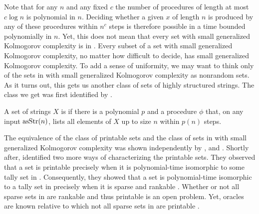 Note that for any $n$ and any fixed $c$ the number of procedures of length at most $c\log n$ is polynomial in $n$.
Deciding whether a given $x$ of length $n$ is produced by any of these procedures within $n^c$ steps is therefore possible in a time bounded polynomially in $n$.
Yet, this does not mean that every set with small generalized Kolmogorov complexity is in .
Every subset of a set with small generalized Kolmogorov complexity, no matter how difficult to decide, has small generalized Kolmogorov complexity.
To add a sense of uniformity, we may want to think only of the sets in  with small generalized Kolmogorov complexity as nonrandom sets.
As it turns out, this gets us another class of sets of highly structured strings.
The class we get was first identified by \textcite{hartmanis1984computation}.
\begin{definition}
  A set of strings $X$ is  if there is a polynomial $p$ and a procedure $\phi$ that, on any input $\operatorname{asStr}(n)$, lists all elements of $X$ up to size $n$ within $p(n)$ steps.
\end{definition}

The equivalence of the class of \pdash{}printable sets and the class of sets in  with small generalized Kolmogorov complexity was shown independently by \textcite{balcazar1986sets}, and \textcite{rubinstein1986note}.
Shortly after, \textcite{allender1988p-printable} identified two more ways of characterizing the \pdash{}printable sets.
They observed that a set is \pdash{}printable precisely when it is polynomial-time isomorphic to some tally set in .
Consequently, they showed that a set is polynomial-time isomorphic to a tally set in  precisely when it is sparse and \pdash{}rankable \parencite[see also][]{goldsmith1996scalability}.
Whether or not all sparse sets in  are \pdash{}rankable and thus \pdash{}printable is an open problem.
Yet, oracles are known relative to which not all sparse sets in  are \pdash{}printable \parencite{hartmanis1983generalized}.

